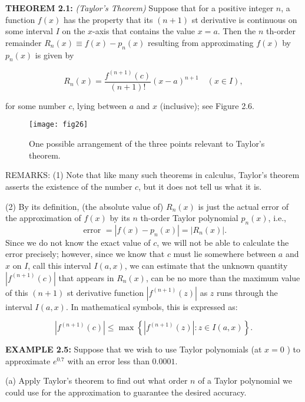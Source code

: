 \documentclass[../main.tex]{subfiles}
\begin{document}
\noindent \textbf{THEOREM 2.1:} \emph{(Taylor's Theorem)} Suppose that for a positive integer $n$, a function $f(x)$ has the property that its $(n+1)$ st derivative is continuous on some interval $I$ on the $x$-axis that contains the value $x=a$. Then the $n$ th-order remainder $R_{n}(x) \equiv f(x)-p_{n}(x)$ resulting from approximating $f(x)$ by $p_{n}(x)$ is given by

\begin{equation} \label{eq:5} \tag{5}
R_{n}(x)=\frac{f^{(n+1)}(c)}{(n+1) !}(x-a)^{n+1} \quad(x \in I),
\end{equation}

for some number $c$, lying between $a$ and $x$ (inclusive); see Figure 2.6.


\begin{figure}[H]
\centering
\texttt{[image: fig26]}
\caption{One possible arrangement of the three points relevant to Taylor's theorem.}
\label{fig:fig_2_6}
\end{figure}

REMARKS: (1) Note that like many such theorems in calculus, Taylor's theorem asserts the existence of the number $c$, but it does not tell us what it is.

(2) By its definition, (the absolute value of) $R_{n}(x)$ is just the actual error of the approximation of $f(x)$ by its $n$ th-order Taylor polynomial $p_{n}(x)$, i.e.,
$$
\text { error }=\left|f(x)-p_{n}(x)\right|=\left|R_{n}(x)\right| .
$$
Since we do not know the exact value of $c$, we will not be able to calculate the error precisely; however, since we know that $c$ must lie somewhere between $a$ and $x$ on $I$, call this interval $I(a, x)$, we can estimate that the unknown quantity $\left|f^{(n+1)}(c)\right|$ that appears in $R_{n}(x)$, can be no more than the maximum value of this $(n+1)$ st derivative function $\left|f^{(n+1)}(z)\right|$ as $z$ runs through the interval $I(a, x)$. In mathematical symbols, this is expressed as:

\begin{equation} \label{eq:6} \tag{6}
\left|f^{(n+1)}(c)\right| \leq \max \left\{\left|f^{(n+1)}(z)\right|: z \in I(a, x)\right\} .
\end{equation}


\textbf{EXAMPLE 2.5:} Suppose that we wish to use Taylor polynomials (at $x=0$ ) to approximate $e^{0.7}$ with an error less than $0.0001$. 

(a) Apply Taylor's theorem to find out what order $n$ of a Taylor polynomial we could use for the approximation to guarantee the desired accuracy.
\end{document}
